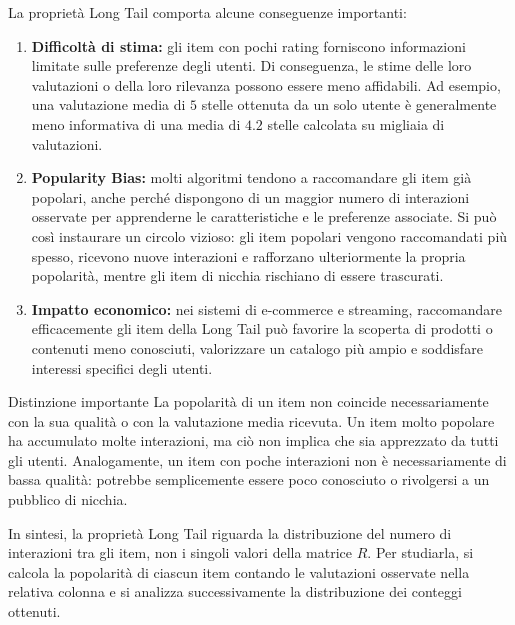 La proprietà Long Tail comporta alcune conseguenze importanti:

\begin{enumerate}
\item \textbf{Difficoltà di stima:} gli item con pochi rating forniscono informazioni limitate sulle preferenze degli utenti. Di conseguenza, le stime delle loro valutazioni o della loro rilevanza possono essere meno affidabili. Ad esempio, una valutazione media di $5$ stelle ottenuta da un solo utente è generalmente meno informativa di una media di $4.2$ stelle calcolata su migliaia di valutazioni.

\item \textbf{Popularity Bias:} molti algoritmi tendono a raccomandare gli item già popolari, anche perché dispongono di un maggior numero di interazioni osservate per apprenderne le caratteristiche e le preferenze associate. Si può così instaurare un circolo vizioso: gli item popolari vengono raccomandati più spesso, ricevono nuove interazioni e rafforzano ulteriormente la propria popolarità, mentre gli item di nicchia rischiano di essere trascurati.

\item \textbf{Impatto economico:} nei sistemi di e-commerce e streaming, raccomandare efficacemente gli item della Long Tail può favorire la scoperta di prodotti o contenuti meno conosciuti, valorizzare un catalogo più ampio e soddisfare interessi specifici degli utenti.

\end{enumerate}

\begin{warning}{Distinzione importante}
La popolarità di un item non coincide necessariamente con la sua qualità o con la valutazione media ricevuta. Un item molto popolare ha accumulato molte interazioni, ma ciò non implica che sia apprezzato da tutti gli utenti. Analogamente, un item con poche interazioni non è necessariamente di bassa qualità: potrebbe semplicemente essere poco conosciuto o rivolgersi a un pubblico di nicchia.
\end{warning}

In sintesi, la proprietà Long Tail riguarda la distribuzione del numero di interazioni tra gli item, non i singoli valori della matrice $R$. Per studiarla, si calcola la popolarità di ciascun item contando le valutazioni osservate nella relativa colonna e si analizza successivamente la distribuzione dei conteggi ottenuti.



